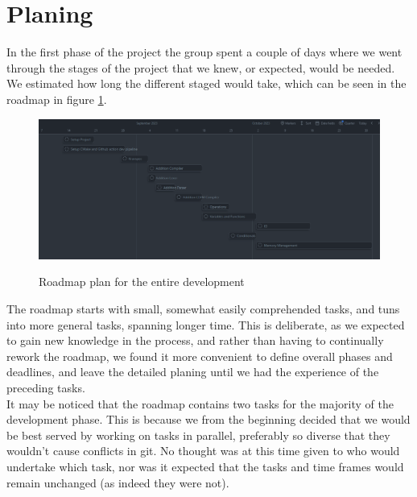 \section{Planing}
In the first phase of the project the group spent a couple of days where we went through the stages of the project that we knew, or expected, would be needed. We estimated how long the different staged would take, which can be seen in the roadmap in figure \ref{fig:roadmap}.
 
\begin{figure}[h]
\includegraphics[width=\textwidth]{02-Body/Images/Roadmap.png}
\label{fig:roadmap}
\caption{Roadmap plan for the entire development}
\end{figure}

The roadmap starts with small, somewhat easily comprehended tasks, and tuns into more general tasks, spanning longer time. This is deliberate, as we expected to gain new knowledge in the process, and rather than having to continually rework the roadmap, we found it more convenient to define overall phases and deadlines, and leave the detailed planing until we had the experience of the preceding tasks.\\
It may be noticed that the roadmap contains two tasks for the majority of the development phase. This is because we from the beginning decided that we would be best served by working on tasks in parallel, preferably so diverse that they wouldn't cause conflicts in git. No thought was at this time given to who would undertake which task, nor was it expected that the tasks and time frames would remain unchanged (as indeed they were not).

